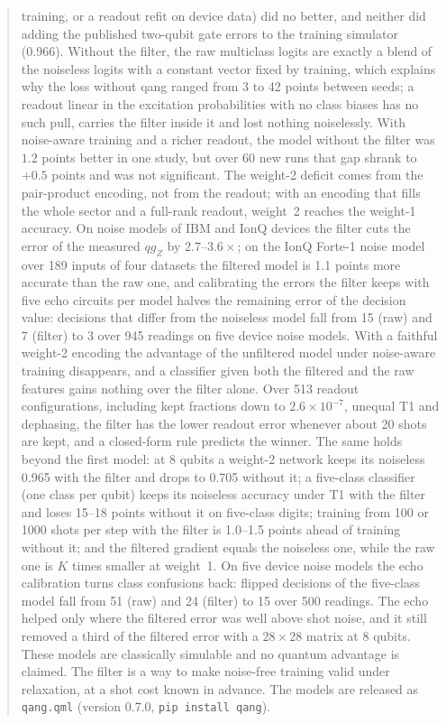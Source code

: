 \documentclass[11pt]{article}
\newcommand{\qZ}{qg_Z}
\begin{document}
\begin{abstract}
training, or a readout refit on device data) did no better, and neither did adding the published two-qubit gate
errors to the training simulator (0.966). Without the filter, the raw multiclass logits are exactly
a blend of the noiseless logits with a constant vector fixed by training, which explains why the loss without qang
ranged from 3 to 42 points between seeds; a readout linear in the excitation probabilities with no class biases has no
such pull, carries the filter inside it and lost nothing noiselessly. With noise-aware training and a richer readout, the model without the filter
was $1.2$ points better in one study, but over 60 new runs that gap shrank to $+0.5$ points and was not
significant. The weight-2 deficit comes from the
pair-product encoding, not from the readout; with an encoding that fills the whole sector and a full-rank
readout, weight~2 reaches the weight-1 accuracy. On noise models of IBM and IonQ devices the filter cuts the
error of the measured $\qZ$ by $2.7$--$3.6\times$; on the IonQ Forte-1 noise model over 189 inputs of four
datasets the filtered model is 1.1 points more accurate than the raw one, and calibrating the errors the filter
keeps with five echo circuits per model halves the remaining error of the decision value: decisions that differ from
the noiseless model fall from 15 (raw) and 7 (filter) to 3 over 945 readings on five device noise models. With a faithful weight-2 encoding the
advantage of the unfiltered model under noise-aware training disappears, and a classifier given both the filtered
and the raw features gains nothing over the filter alone. Over 513 readout configurations, including kept fractions
down to $2.6\times10^{-7}$, unequal T1 and dephasing, the filter has the lower readout error whenever about 20 shots
are kept, and a closed-form rule predicts the winner. The same holds beyond the first model: at 8 qubits a weight-2
network keeps its noiseless 0.965 with the filter and drops to 0.705 without it; a five-class classifier (one class per
qubit) keeps its noiseless accuracy under T1 with the filter and loses 15--18 points without it on five-class digits; training from 100 or
1000 shots per step with the filter is 1.0--1.5 points ahead of training without it; and the filtered gradient equals
the noiseless one, while the raw one is $K$ times smaller at weight~1. On five device noise models the echo calibration
turns class confusions back: flipped decisions of the five-class model fall from 51 (raw) and 24 (filter) to 15 over
500 readings. The echo helped only where the filtered error was well above shot noise, and it still removed a third of the
filtered error with a $28\times28$ matrix at 8 qubits. These models are classically simulable and no quantum
advantage is claimed. The filter is a way to make noise-free training valid under relaxation, at a
shot cost known in advance. The models are released as \texttt{qang.qml} (version 0.7.0,
\texttt{pip install qang}).
\end{abstract}
\end{document}
